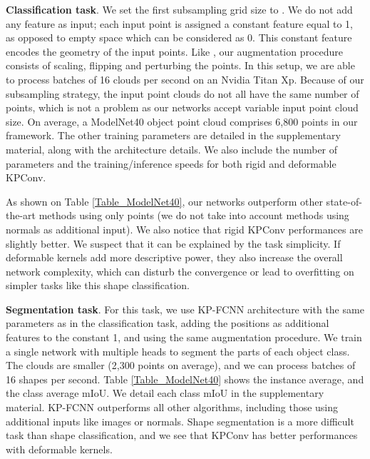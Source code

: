 \documentclass[10pt,twocolumn,letterpaper]{article}
\begin{document}
\noindent
\textbf{Classification task}. We set the first subsampling grid size to . We do not add any feature as input; each input point is assigned a constant feature equal to 1, as opposed to empty space which can be considered as 0. This constant feature encodes the geometry of the input points. Like \cite{atzmon2018point}, our augmentation procedure consists of scaling, flipping and perturbing the points. In this setup, we are able to process  batches of 16 clouds per second on an Nvidia Titan Xp. Because of our subsampling strategy, the input point clouds do not all have the same number of points, which is not a problem as our networks accept variable input point cloud size. On average, a ModelNet40 object point cloud comprises 6,800 points in our framework. The other training parameters are detailed in the supplementary material, along with the architecture details. We also include the number of parameters and the training/inference speeds for both rigid and deformable KPConv.

As shown on Table \ref{Table_ModelNet40}, our networks outperform other state-of-the-art methods using only points (we do not take into account methods using normals as additional input). We also notice that rigid KPConv performances are slightly better. We suspect that it can be explained by the task simplicity. If deformable kernels add more descriptive power, they also increase the overall network complexity, which can disturb the convergence or lead to overfitting on simpler tasks like this shape classification. 

\noindent
\textbf{Segmentation task}. For this task, we use KP-FCNN architecture with the same parameters as in the classification task, adding the positions  as additional features to the constant 1, and using the same augmentation procedure. We train a single network with multiple heads to segment the parts of each object class. The clouds are smaller (2,300 points on average), and we can process  batches of 16 shapes per second. Table \ref{Table_ModelNet40} shows the instance average, and the class average mIoU. We detail each class mIoU in the supplementary material. KP-FCNN outperforms all other algorithms, including those using additional inputs like images or normals. Shape segmentation is a more difficult task than shape classification, and we see that KPConv has better performances with deformable kernels.
\end{document}
